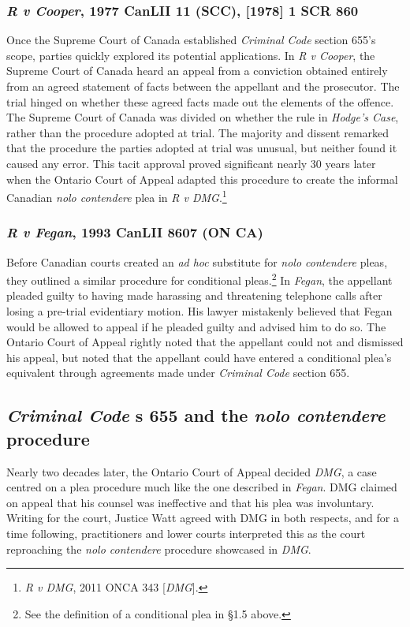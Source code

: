 \subsubsection{\textit{R v Cooper}, 1977 CanLII 11 (SCC), [1978] 1 SCR 860}

Once the Supreme Court of Canada established \textit{Criminal Code} section 655's scope, parties quickly explored its potential applications. In \textit{R v Cooper}, the Supreme Court of Canada heard an appeal from a conviction obtained entirely from an agreed statement of facts between the appellant and the prosecutor. The trial hinged on whether these agreed facts made out the elements of the offence. The Supreme Court of Canada was divided on whether the rule in \textit{Hodge's Case}, rather than the procedure adopted at trial. The majority and dissent remarked that the procedure the parties adopted at trial was unusual, but neither found it caused any error. This tacit approval proved significant nearly 30 years later when the Ontario Court of Appeal adapted this procedure to create the informal Canadian \textit{nolo contendere} plea in \textit{R v DMG}.\footnote{\textit{R v DMG}, 2011 ONCA 343 [\textit{DMG}].}

\subsubsection{\textit{R v Fegan}, 1993 CanLII 8607 (ON CA)}

Before Canadian courts created an \textit{ad hoc} substitute for \textit{nolo contendere} pleas, they outlined a similar procedure for conditional pleas.\footnote{See the definition of a conditional plea in \S 1.5 above.} In \textit{Fegan}, the appellant pleaded guilty to having made harassing and threatening telephone calls after losing a pre-trial evidentiary motion. His lawyer mistakenly believed that Fegan would be allowed to appeal if he pleaded guilty and advised him to do so. The Ontario Court of Appeal rightly noted that the appellant could not and dismissed his appeal, but noted that the appellant could have entered a conditional plea's equivalent through agreements made under \textit{Criminal Code} section 655.

\subsection{\textit{Criminal Code} s 655 and the \textit{nolo contendere} procedure}

Nearly two decades later, the Ontario Court of Appeal decided \textit{DMG}, a case centred on a plea procedure much like the one described in \textit{Fegan}. DMG claimed on appeal that his counsel was ineffective and that his plea was involuntary. Writing for the court, Justice Watt agreed with DMG in both respects, and for a time following, practitioners and lower courts interpreted this as the court reproaching the \textit{nolo contendere} procedure showcased in \textit{DMG}.

